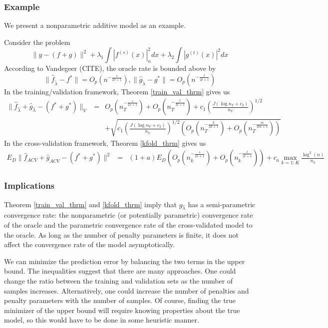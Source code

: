 \documentclass[12pt]{article}
\begin{document}
\subsubsection{Example}

We present a nonparametric additive model as an example.

Consider the problem
\begin{equation}
\| y - (f + g) \|^2 + \lambda_1 \int |f^{(s)}(x)|_n^2 dx + \lambda_2 \int |g^{(t)}(x)|^2 dx
\end{equation}
According to Vandegeer (CITE), the oracle rate is bounded above by
\begin{equation}
\| \hat{f}_{\tilde \lambda} - f^* \| = O_p(n^{-\frac{s}{2s+1}}), \| \hat{g}_{\tilde \lambda} - g^* \| = O_p(n^{-\frac{t}{2t+1}})
\end{equation}
In the training/validation framework, Theorem \ref{train_val_thrm} gives us
\begin{eqnarray*}
\| \hat{f}_{\hat \lambda} + \hat{g}_{\hat \lambda} - (f^* + g^*) \|_V &=& 
O_p(n_T^{-\frac{s}{2s+1}}) + O_p(n_T^{-\frac{t}{2t+1}}) 
+c_{1} \left (\frac{J(\log n_{V}+c_{2})}{n_{V}} \right )^{1/2} \\
&& +\sqrt{ c_{1} \left (\frac{J(\log n_{V}+c_{2})}{n_{V}} \right )^{1/2}  \left (O_p(n_T^{-\frac{k}{2k+1}}) + O_p(n_T^{-\frac{m}{2m+1}}) \right) }
\end{eqnarray*}
In the cross-validation framework, Theorem \ref{kfold_thrm} gives us
\begin{eqnarray*}
E_D \| \hat{f}_{ACV} + \hat{g}_{ACV} - (f^* + g^*) \|^2 &=& 
(1+a) E_D  \left (O_p(n_k^{-\frac{s}{2s+1}}) + O_p(n_k^{-\frac{t}{2t+1}})  \right )
+ c_a \max_{k=1:K} \frac{\log^2(n)}{n_k}
\end{eqnarray*}

\subsubsection{Implications}
Theorem \ref{train_val_thrm} and \ref{kfold_thrm} imply that $\hat{g}_{\hat{\lambda}}$ has a semi-parametric convergence rate: the nonparametric (or potentially parametric) convergence rate of the oracle and the parametric convergence rate of the cross-validated model to the oracle. As long as the number of penalty parameters is finite, it does not affect the convergence rate of the model asymptotically.

We can minimize the prediction error by balancing the two terms in the upper bound. The inequalities suggest that there are many approaches. One could change the ratio between the training and validation sets as the number of samples increases. Alternatively, one could increase the number of penalties and penalty parameters with the number of samples. Of course, finding the true minimizer of the upper bound will require knowing properties about the true model, so this would have to be done in some heuristic manner.
\end{document}
